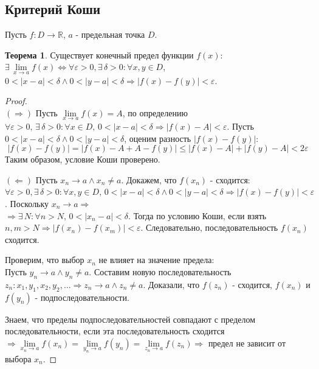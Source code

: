\documentclass[12pt]{article}
\theoremstyle{definition}
\newtheorem{theorem}{Теорема}
\begin{document}
\subsection*{Критерий Коши}

Пусть $f \colon D \to \mathbb{R}$, $a$ - предельная точка $D$.

\begin{theorem}
	Существует конечный предел функции $f(x)$: $\exists \, \lim\limits_{x\to a} f(x) \Leftrightarrow \forall \varepsilon > 0, \exists \, \delta > 0 \colon \forall x,y \in D$, \\ $0 < |x -a| < \delta \wedge 0 < |y - a| < \delta \Rightarrow |f(x) -f(y)| < \varepsilon$.
\end{theorem}

\begin{proof}\hfill\\
	$(\Rightarrow)$ Пусть $\lim\limits_{x \to a}f(x) =A$, по определению $\forall \varepsilon > 0, \, \exists \, \delta > 0 \colon \forall x \in D, \, 0 < |x-a| < \delta \Rightarrow |f(x) - A| < \varepsilon$. Пусть $ 0 < |x -a| < \delta \wedge 0 < |y - a| < \delta$, оценим разность $|f(x) - f(y)|$: $$|f(x) - f(y)| = |f(x) - A + A - f(y)| \leq |f(x) - A| + |f(y) - A| < 2 \varepsilon$$
	Таким образом, условие Коши проверено.
	
	$(\Leftarrow)$ Пусть $x_n \to a \wedge x_n \neq a$. Докажем, что $f(x_n)$ - сходится:\\
	$\forall \varepsilon > 0, \exists \, \delta > 0\colon \forall x,y \in D, \, 0 < |x -a| < \delta \wedge 0 < |y - a| < \delta \Rightarrow |f(x) -f(y)| < \varepsilon$. Поскольку $x_n \to a \Rightarrow$ \\
	$\Rightarrow \exists \, N \colon \forall n > N, \, 0<|x_n - a| < \delta$. Тогда по условию Коши, если взять $n, m > N \Rightarrow |f(x_n) - f(x_m)| < \varepsilon$. Следовательно, последовательность $f(x_n)$ сходится. 
	
	Проверим, что выбор $x_n$ не влияет на значение предела: \\
	Пусть $y_n \to a \wedge y_n \neq a$. Составим новую последовательность $z_n \colon x_1, y_1, x_2, y_2, \dotsc \Rightarrow z_n \to a \wedge z_n \neq a$. Доказали, что $f(z_n)$ - сходится, $f(x_n)$ и $f(y_n)$ - подпоследовательности. 
	
	Знаем, что пределы подпоследовательностей совпадают с пределом последовательности, если эта последовательность сходится $\Rightarrow \lim\limits_{x_n \to a}f(x_n) = \lim\limits_{y_n \to a}f(y_n)= \lim\limits_{z_n \to a}f(z_n) \Rightarrow$ предел не зависит от выбора $x_n$.
\end{proof}
\end{document}
